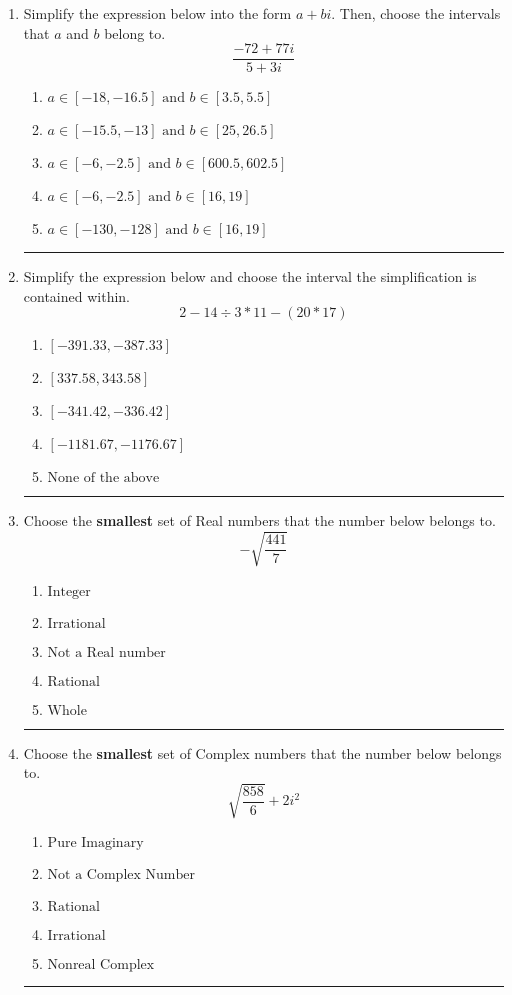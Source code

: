 \documentclass[14pt]{extbook}
\newcommand{\litem}[1]{\item#1\hspace*{-1cm}\rule{\textwidth}{0.4pt}}
\begin{document}
\begin{enumerate}
\litem{
Simplify the expression below into the form $a+bi$. Then, choose the intervals that $a$ and $b$ belong to.\[ \frac{-72 + 77 i}{5 + 3 i} \]\begin{enumerate}[label=\Alph*.]
\item \( a \in [-18, -16.5] \text{ and } b \in [3.5, 5.5] \)
\item \( a \in [-15.5, -13] \text{ and } b \in [25, 26.5] \)
\item \( a \in [-6, -2.5] \text{ and } b \in [600.5, 602.5] \)
\item \( a \in [-6, -2.5] \text{ and } b \in [16, 19] \)
\item \( a \in [-130, -128] \text{ and } b \in [16, 19] \)

\end{enumerate} }
\litem{
Simplify the expression below and choose the interval the simplification is contained within.\[ 2 - 14 \div 3 * 11 - (20 * 17) \]\begin{enumerate}[label=\Alph*.]
\item \( [-391.33, -387.33] \)
\item \( [337.58, 343.58] \)
\item \( [-341.42, -336.42] \)
\item \( [-1181.67, -1176.67] \)
\item \( \text{None of the above} \)

\end{enumerate} }
\litem{
Choose the \textbf{smallest} set of Real numbers that the number below belongs to.\[ -\sqrt{\frac{441}{7}} \]\begin{enumerate}[label=\Alph*.]
\item \( \text{Integer} \)
\item \( \text{Irrational} \)
\item \( \text{Not a Real number} \)
\item \( \text{Rational} \)
\item \( \text{Whole} \)

\end{enumerate} }
\litem{
Choose the \textbf{smallest} set of Complex numbers that the number below belongs to.\[ \sqrt{\frac{858}{6}}+2i^2 \]\begin{enumerate}[label=\Alph*.]
\item \( \text{Pure Imaginary} \)
\item \( \text{Not a Complex Number} \)
\item \( \text{Rational} \)
\item \( \text{Irrational} \)
\item \( \text{Nonreal Complex} \)


\end{enumerate}}
\end{enumerate}
\end{document}
